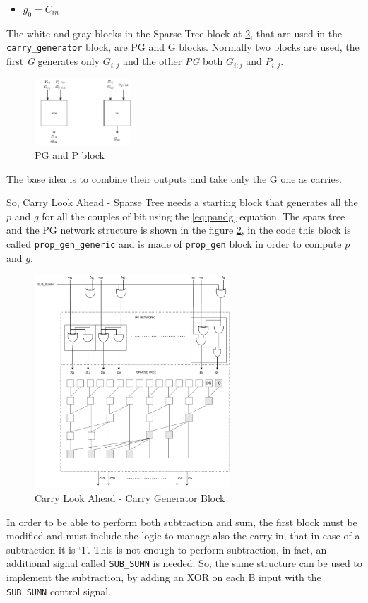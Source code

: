 \begin{itemize}
\begin{itemize}
		\item $g_0 = C_{in}$
	\end{itemize}
	The white and gray blocks in the Sparse Tree block at \ref{fig:pg_network}, that are used in the \texttt{carry\_generator} block, are PG and G blocks.
	Normally two blocks are used, the first \textit{G} generates only $G_{i:j}$ and the other \textit{PG} both $G_{i:j}$ and $P_{i:j}$.
	\begin{figure}[h]
		\centering
		\includegraphics[width=0.32\textwidth]{chapters/5_ExecuteStage/images/PG_and_G.pdf}
		\caption{PG and P block}
		\label{fig:PG_and_G}
	\end{figure}
	The base idea is to combine their outputs and take only the G one as carries.
\end{itemize}
So, Carry Look Ahead - Sparse Tree needs a starting block that generates all the $p$ and $g$ for all the couples of bit using the \ref{eq:pandg} equation. The spars tree and the PG network structure is shown in the figure \ref{fig:pg_network}, in the code this block is called \texttt{prop\_gen\_generic} and is made of \texttt{prop\_gen} block in order to compute $p$ and $g$.
\begin{figure}[H]
	\centering
	\includegraphics[width=0.65\textwidth]{chapters/5_ExecuteStage/images/CLA.pdf}
	\caption{Carry Look Ahead - Carry Generator Block}
	\label{fig:pg_network}
\end{figure}
In order to be able to perform both subtraction and sum, the first block must be modified and must include the logic to manage also the carry-in, that in case of a subtraction it is `1'. This is not enough to perform subtraction, in fact, an additional signal called \texttt{SUB\_SUMN} is needed.
So, the same structure can be used to implement the subtraction, by adding an XOR on each B input with the \texttt{SUB\_SUMN} control signal.

